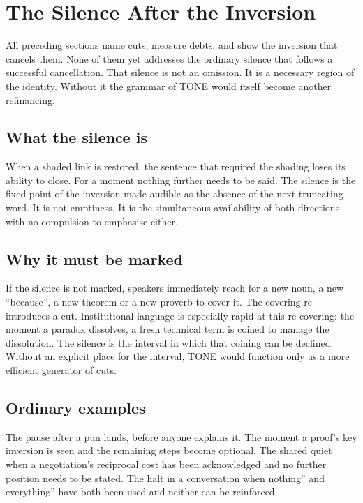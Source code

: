 \documentclass[11pt,a4paper]{article}
\begin{document}
\section{The Silence After the Inversion}

All preceding sections name cuts, measure debts, and show the inversion that cancels them. None of them yet addresses the ordinary silence that follows a successful cancellation. That silence is not an omission. It is a necessary region of the identity. Without it the grammar of TONE would itself become another refinancing.

\subsection{What the silence is} When a shaded link is restored, the sentence that required the shading loses its ability to close. For a moment nothing further needs to be said. The silence is the fixed point of the inversion made audible as the absence of the next truncating word. It is not emptiness. It is the simultaneous availability of both directions with no compulsion to emphasise either.

\subsection{Why it must be marked} If the silence is not marked, speakers immediately reach for a new noun, a new ``because'', a new theorem or a new proverb to cover it. The covering re-introduces a cut. Institutional language is especially rapid at this re-covering: the moment a paradox dissolves, a fresh technical term is coined to manage the dissolution. The silence is the interval in which that coining can be declined. Without an explicit place for the interval, TONE would function only as a more efficient generator of cuts.

\subsection{Ordinary examples}

    The pause after a pun lands, before anyone explains it.
    The moment a proof’s key inversion is seen and the remaining steps become optional.
    The shared quiet when a negotiation’s reciprocal cost has been acknowledged and no further position needs to be stated.
    The halt in a conversation when nothing'' and everything'' have both been used and neither can be reinforced.
\end{document}
